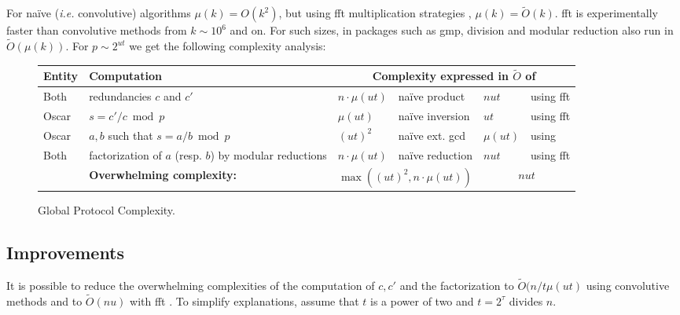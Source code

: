 \documentclass[11pt]{llncs}
\newcommand{\Oapp}{\ensuremath{\tilde{O}}}
\begin{document}
For na\"{i}ve ({\sl i.e.} convolutive) algorithms $\mu(k) = O(k^2)$, but using {\sc fft} multiplication strategies \cite{schonhage1971schnelle}, $\mu(k) = \Oapp(k)$. {\sc fft} is experimentally faster than convolutive methods from $k \sim 10^6$ and on. For such sizes, in packages such as {\sf gmp}, division and modular reduction also run in $\Oapp(\mu(k))$. For $p \sim 2^{ut}$ we get the following complexity analysis:

\begin{figure}
  \begin{tabularx}{\textwidth}{lXp{1.2cm}p{2.3cm}p{1.2cm}p{2.3cm}}\toprule
{\bf \hfill Entity \hfill \null} & {\bf \hfill Computation \hfill \null} &
    \multicolumn{4}{c}{{\bf Complexity expressed in $\Oapp$ of}} \\\midrule
Both  & redundancies $c$ and $c'$                                        & $n \cdot \mu(u t)$  & na\"{i}ve product & $n u t$  & using {\sc fft}             \\
Oscar & $s = c' / c \bmod p$                                             & $\mu(u t)$    & na\"{i}ve inversion& $u t$    & using {\sc fft}               \\
Oscar & $a,b$ such that $s = a / b \bmod p$                              & $(u t)^2$   & na\"{i}ve ext. {\sc gcd} & $\mu(u t)$ &  using \cite{pan2004rational,wang2003acceleration} \\
Both  & factorization of $a$ (resp. $b$) by modular reductions           & $n \cdot \mu(u t)$  & na\"{i}ve reduction & $n u t$  & using {\sc fft}             \\
      & {\bf Overwhelming complexity:}                                   &
    \multicolumn{2}{c}{$\max((u t)^2,n \cdot \mu(ut))$ }    &
    \multicolumn{2}{c}{$n u t$}              \\\bottomrule
  \end{tabularx}
  \caption{Global Protocol Complexity.}
  \label{tab:workload}
\end{figure}


\subsection{Improvements}

It is possible to reduce the overwhelming complexities of the computation of $c,c'$ and the factorization to $\Oapp(n/t \mu(u t)$ using convolutive methods and to $\Oapp(n u)$ with {\sc fft} \cite{schonhage1971schnelle}. To simplify explanations, assume that $t$ is a power of two and $t=2^\tau$ divides $n$.
\end{document}
